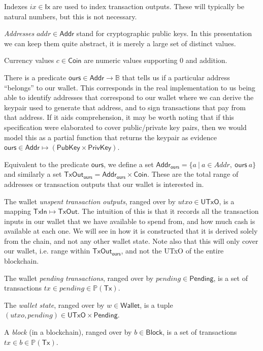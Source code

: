 \documentclass{article}
\newcommand{\powerset}[1]{\mathbb{P}(#1)}
\begin{document}
Indexes $ix \in \mathsf{Ix}$ are used to index transaction outputs. These will
typically be natural numbers, but this is not necessary.

\emph{Addresses} $addr \in \mathsf{Addr}$ stand for cryptographic public keys. In this
presentation we can keep them quite abstract, it is merely a large set of
distinct values.

Currency values $c \in \mathsf{Coin}$ are numeric values supporting 0 and addition.

There is a predicate $\mathsf{ours} \in \mathsf{Addr} \to \mathbb{B}$
that tells us if a particular address ``belongs'' to our wallet.
This corresponds in the real implementation to us being able to identify
addresses that correspond to our wallet where we can derive the keypair used
to generate that address, and to sign transactions that pay from that address.
If it aids comprehension, it may be worth noting that if this specification
were elaborated to cover public/private key pairs, then we would model this as
a partial function that returns the keypair as evidence
$\mathsf{ours} \in \mathsf{Addr} \mapsto (\mathsf{PubKey} \times \mathsf{PrivKey})$.

Equivalent to the predicate $\mathsf{ours}$, we define a set
$\mathsf{Addr_{ours}} = \{ a ~|~ a \in Addr, ~ \mathsf{ours} ~ a \}$ and
similarly a set
$\mathsf{TxOut_{ours}} = \mathsf{Addr_{ours}} \times \mathsf{Coin}$. These are
the total range of addresses or transaction outputs that our wallet is
interested in.

The wallet \emph{unspent transaction outputs}, ranged over by
$utxo \in \mathsf{UTxO}$, is a mapping $\mathsf{TxIn} \mapsto \mathsf{TxOut}$.
The intuition of this is that it records all the transaction inputs in our
wallet that we have available to spend from, and how much cash is available at
each one. We will see in how it is constructed that it is derived solely from
the chain, and not any other wallet state. Note also that this will only cover
our wallet, i.e. range within $\mathsf{TxOut_{ours}}$, and not the UTxO of the
entire blockchain.

The wallet \emph{pending transactions}, ranged over by
$pending \in \mathsf{Pending}$, is a set of transactions
$tx \in pending \in \powerset{\mathsf{Tx}}$.

The \emph{wallet state}, ranged over by $w \in \mathsf{Wallet}$, is a tuple
$(utxo, pending) \in \mathsf{UTxO} \times \mathsf{Pending}$.

A \emph{block} (in a blockchain), ranged over by $b \in \mathsf{Block}$, is a
set of transactions $tx \in b \in \powerset{\mathsf{Tx}}$.
\end{document}
